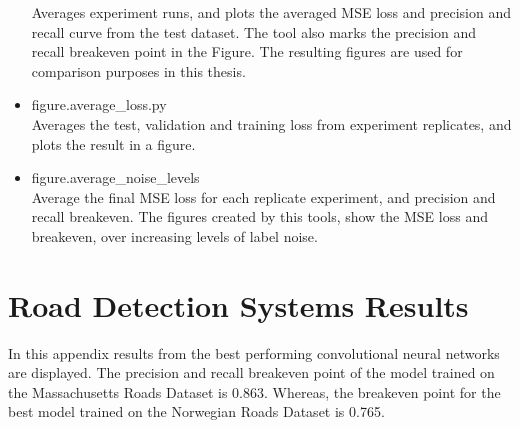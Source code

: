 \begin{itemize}
Averages experiment runs, and plots the averaged MSE loss and precision and recall curve from the test dataset. The tool also marks the precision and recall breakeven point in the Figure. The resulting figures are used for comparison purposes in this thesis.
\item figure.average\_loss.py\\
Averages the test, validation and training loss from experiment replicates, and plots the result in a figure. 
\item figure.average\_noise\_levels\\
Average the final MSE loss for each replicate experiment, and precision and recall breakeven. 
The figures created by this tools, show the MSE loss and breakeven, over increasing levels of label noise.
\end{itemize}

\section{Road Detection Systems Results}
In this appendix results from the best performing convolutional neural networks are displayed. The precision and recall breakeven point of the model trained on the Massachusetts Roads Dataset is 0.863. Whereas, the breakeven point for the best model trained on the Norwegian Roads Dataset is 0.765.  \\

